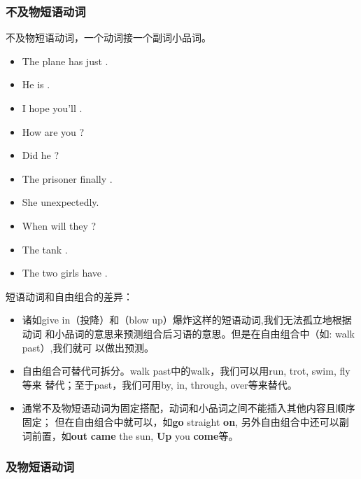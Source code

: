 \subsubsection{不及物短语动词}

不及物短语动词，一个动词接一个副词小品词。
\begin{itemize}
\item The plane has just .
\item He is .
\item I hope you'll .
\item How are you ?
\item Did he ?
\item The prisoner finally .
\item She  unexpectedly.
\item When will they ?
\item The tank .
\item The two girls have .

\end{itemize}

短语动词和自由组合的差异：
\begin{itemize}
\item 诸如give in（投降）和（blow up）爆炸这样的短语动词,我们无法孤立地根据动词
和小品词的意思来预测组合后习语的意思。但是在自由组合中（如: walk past）,我们就可
以做出预测。

\item 自由组合可替代可拆分。walk past中的walk，我们可以用run, trot, swim, fly等来
替代；至于past，我们可用by, in, through, over等来替代。


\item 通常不及物短语动词为固定搭配，动词和小品词之间不能插入其他内容且顺序固定；
但在自由组合中就可以，如\textbf{go} straight \textbf{on}, 另外自由组合中还可以副
词前置，如\textbf{out} \textbf{came} the sun, \textbf{Up} you \textbf{come}等。

\end{itemize}

\subsubsection{及物短语动词}

